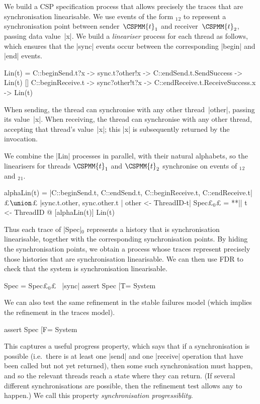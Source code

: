 We build a CSP specification process that allows precisely the traces that are
synchronisation linearisable.  We use events of the form
$_1$$_2$ to represent a synchronisation point
between sender~$\CSPMM{t}_1$ and receiver~$\CSPMM{t}_2$, passing data
value~|x|.  We build a \emph{lineariser} process for each thread as follows,
which ensures that the |sync| events occur between the corresponding |begin|
and |end| events.
%
\begin{cspm}
Lin(t) = 
  C::beginSend.t?x -> sync.t?other!x -> C::endSend.t.SendSuccess -> Lin(t)
  [] C::beginReceive.t -> sync?other!t?x -> C::endReceive.t.ReceiveSuccess.x -> Lin(t)
\end{cspm}
%
When sending, the thread can synchronise with any other thread~|other|,
passing its value~|x|.  When receiving, the thread can synchronise with any
other thread, accepting that thread's value~|x|; this |x| is subsequently
returned by the invocation.

We combine the |Lin| processes in parallel, with their natural
alphabets, so the linearisers for threads $\CSPMM{t}_1$ and $\CSPMM{t}_2$
synchronise on events of $_1$$_2$ and
$_2$$_1$.  
%
\begin{cspm}
alphaLin(t) =
  {|C::beginSend.t, C::endSend.t, C::beginReceive.t, C::endReceive.t|} £$\union$£
  {|sync.t.other, sync.other.t | other <- ThreadID-{t}|}
Spec£$_0$£ = **|| t <- ThreadID @ [alphaLin(t)] Lin(t)
\end{cspm} %
%
Thus each trace of |Spec|$_0$ represents a history that is synchronisation
linearisable, together with the corresponding synchronisation points.  By
hiding the synchronisation points, we obtain a process whose traces represent
precisely those histories that are synchronisation linearisable.  We can then
use FDR to check that the system is synchronisation linearisable. 
%
\begin{cspm}
Spec = Spec£$_0$£ \ {|sync|}
assert Spec [T= System
\end{cspm}

We can also test the same refinement in the stable failures model (which
implies the refinement in the traces model).
%
\begin{cspm}
assert Spec [F= System
\end{cspm}
%
This captures a useful progress property, which says that if a synchronisation
is possible (i.e.~there is at least one |send| and one |receive| operation
that have been called but not yet returned), then some such synchronisation
must happen, and so the relevant threads reach a state where they can return.  
(If several different synchronisations are possible, then the refinement test
allows any to happen.)  We call this property \emph{synchronisation
  progressiblity}. 

